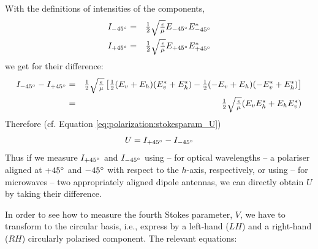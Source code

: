 With the definitions of intensities of the components,
\begin{eqnarray}
  \label{eq:polarization:Im45}
  I_{-45^\circ} &=& \textstyle\frac{1}{2}\sqrt{\textstyle{\frac{\epsilon}{\mu}}} E_{-45^\circ} E_{-45^\circ}^\ast\\
  \label{eq:polarization:Ip45}
  I_{+45^\circ} &=& \textstyle\frac{1}{2}\sqrt{\textstyle{\frac{\epsilon}{\mu}}} E_{+45^\circ} E_{+45^\circ}^\ast
\end{eqnarray}
we get for their difference:
\begin{eqnarray}
   I_{-45^\circ} -  I_{+45^\circ}
   &=&
     \textstyle\frac{1}{2}\sqrt{\textstyle{\frac{\epsilon}{\mu}}}\left[
      \textstyle\frac{1}{2} (E_v + E_h) (E_v^\ast + E_h^\ast)
       - \textstyle\frac{1}{2} (-E_v + E_h) (-E_v^\ast + E_h^\ast)\right]\\ \nonumber
   &=&
   \textstyle\frac{1}{2}\sqrt{\textstyle{\frac{\epsilon}{\mu}}}(E_v E_h^\ast + E_h E_v^\ast)
  \label{eq:polarization:Idiff_lin45base}
\end{eqnarray}
Therefore (cf. Equation \ref{eq:polarization:stokesparam_U})
\begin{equation}
  \label{eq:polarization:U_Idiff}
  U =   I_{+45^\circ} -  I_{-45^\circ}
\end{equation}
Thus if we measure $I_{+45^\circ}$ and $I_{-45^\circ}$ using -- for
optical wavelengths -- a polariser aligned at $+45^\circ$ and
$-45^\circ$ with respect to the $h$-axis, respectively, or using --
for microwaves -- two appropriately aligned dipole antennas, we can
directly obtain $U$ by taking their difference.

In order to see how to measure the fourth Stokes parameter, $V$, we
have to transform to the circular basis, i.e., express  by a
left-hand ($LH$) and a right-hand ($RH$) circularly polarised component. The
relevant equations:

